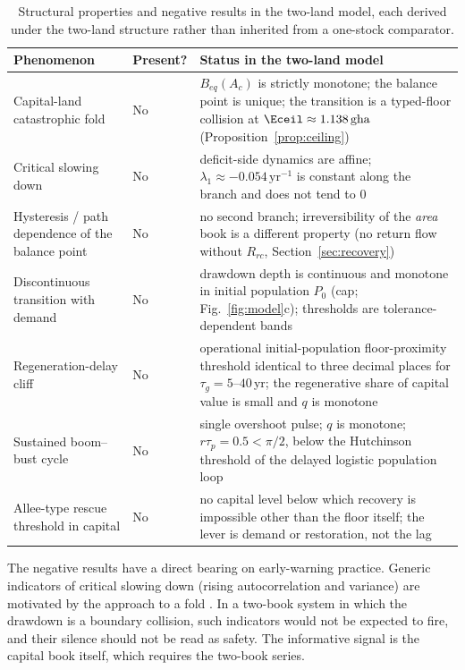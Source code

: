 \begin{table}[!htbp]
\centering\small
\caption{Structural properties and negative results in the two-land model, each derived under the two-land structure rather than inherited from a one-stock comparator.}
\label{tab:neg}
\begin{tabularx}{\textwidth}{>{\raggedright\arraybackslash}p{} l X}
\toprule
Phenomenon & Present? & Status in the two-land model \\
\midrule
Capital-land catastrophic fold & No & $B_{eq}(A_c)$ is strictly monotone; the balance point is unique; the transition is a typed-floor collision at $\Eceil\approx1.138\,\mathrm{gha}$ (Proposition~\ref{prop:ceiling}) \\
Critical slowing down & No & deficit-side dynamics are affine; $\lambda_1\approx-0.054\,\mathrm{yr}^{-1}$ is constant along the branch and does not tend to $0$ \\
Hysteresis / path dependence of the balance point & No & no second branch; irreversibility of the \emph{area} book is a different property (no return flow without $R_{rc}$, Section~\ref{sec:recovery}) \\
Discontinuous transition with demand & No & drawdown depth is continuous and monotone in initial population $P_0$ (cap; Fig.~\ref{fig:model}c); thresholds are tolerance-dependent bands \\
Regeneration-delay cliff & No & operational initial-population floor-proximity threshold identical to three decimal places for $\tau_g=5$--$40$\,yr; the regenerative share of capital value is small and $q$ is monotone \\
Sustained boom--bust cycle & No & single overshoot pulse; $q$ is monotone; $r\tau_p=0.5<\pi/2$, below the Hutchinson threshold of the delayed logistic population loop \citep{Hutchinson1948} \\
Allee-type rescue threshold in capital & No & no capital level below which recovery is impossible other than the floor itself; the lever is demand or restoration, not the lag \\
\bottomrule
\end{tabularx}
\end{table}

The negative results have a direct bearing on early-warning practice. Generic indicators of critical slowing down (rising autocorrelation and variance) are motivated by the approach to a fold \citep{Scheffer2001}. In a two-book system in which the drawdown is a boundary collision, such indicators would not be expected to fire, and their silence should not be read as safety. The informative signal is the capital book itself, which requires the two-book series.

